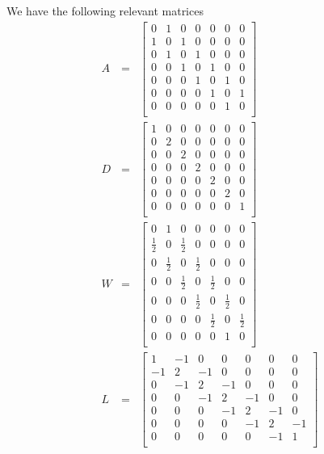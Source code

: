\documentclass{article}
\theoremstyle{definition}
\theoremstyle{remark}
\numberwithin{equation}{section}
\newcommand{\half}{\frac{1}{2}}
\begin{document}
We have the following relevant matrices
\begin{eqnarray}
A & = & \begin{bmatrix}
0 & 1 & 0 & 0 & 0 & 0 & 0\\
1 & 0 & 1 & 0 & 0 & 0 & 0\\
0 & 1 & 0 & 1& 0 & 0 & 0\\
0 & 0 & 1 & 0 & 1 & 0 & 0\\
0 & 0 & 0 & 1 & 0 & 1 & 0\\
0 & 0 & 0 & 0 & 1 & 0 & 1\\
0 & 0 & 0 & 0 & 0 & 1 & 0\\
\end{bmatrix}\\
D & = & \begin{bmatrix}
1 & 0 & 0 & 0 & 0 & 0 & 0\\
0 & 2 & 0 & 0 & 0 & 0 & 0\\
0 & 0 & 2 & 0 & 0 & 0 & 0\\
0 & 0 & 0 & 2 & 0 & 0 & 0\\
0 & 0 & 0 & 0 & 2 & 0 & 0\\
0 & 0 & 0 & 0 & 0 & 2 & 0\\
0 & 0 & 0 & 0 & 0 & 0 & 1\\
\end{bmatrix} \\
W & = & \begin{bmatrix}
0 & 1 & 0 & 0 & 0 & 0 & 0\\
\half & 0 & \half & 0 & 0 & 0 & 0\\
0 & \half & 0 & \half & 0 & 0 & 0\\
0 & 0 & \half & 0 & \half & 0 & 0\\
0 & 0 & 0 & \half & 0 & \half & 0\\
0 & 0 & 0 & 0 & \half & 0 & \half \\
0 & 0 & 0 & 0 & 0 & 1 & 0\\
\end{bmatrix}\\
L & = & \begin{bmatrix}
1 & -1 & 0 & 0 & 0 & 0 & 0\\
-1 & 2 & -1 & 0 & 0 & 0 & 0\\
0 & -1 & 2 & -1 & 0 & 0 & 0\\
0 & 0 & -1 & 2 & -1 & 0 & 0\\
0 & 0 & 0 & -1 & 2 & -1 & 0\\
0 & 0 & 0 & 0 & -1 & 2 & -1\\
0 & 0 & 0 & 0 & 0 & -1 & 1\\
\end{bmatrix}
\end{eqnarray}
\end{document}
